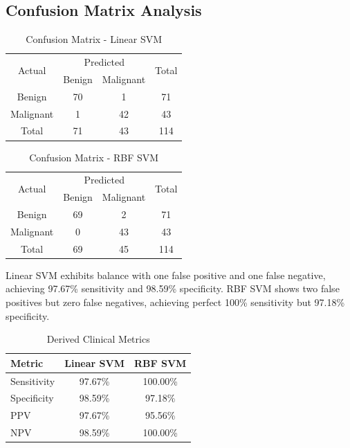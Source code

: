 \documentclass[conference]{IEEEtran}
\begin{document}
\subsection{Confusion Matrix Analysis}

\begin{table}[htbp]
\caption{Confusion Matrix - Linear SVM}
\begin{center}
\footnotesize
\begin{tabular}{cccc}
\toprule
\multirow{2}{*}{Actual} & \multicolumn{2}{c}{Predicted} & \multirow{2}{*}{Total} \\
\cmidrule{2-3}
 & Benign & Malignant & \\
\midrule
Benign & 70 & 1 & 71 \\
Malignant & 1 & 42 & 43 \\
\midrule
Total & 71 & 43 & 114 \\
\bottomrule
\end{tabular}
\label{tab5}
\end{center}
\end{table}

\begin{table}[htbp]
\caption{Confusion Matrix - RBF SVM}
\begin{center}
\footnotesize
\begin{tabular}{cccc}
\toprule
\multirow{2}{*}{Actual} & \multicolumn{2}{c}{Predicted} & \multirow{2}{*}{Total} \\
\cmidrule{2-3}
 & Benign & Malignant & \\
\midrule
Benign & 69 & 2 & 71 \\
Malignant & 0 & 43 & 43 \\
\midrule
Total & 69 & 45 & 114 \\
\bottomrule
\end{tabular}
\label{tab6}
\end{center}
\end{table}

Linear SVM exhibits balance with one false positive and one false negative, achieving 97.67\% sensitivity and 98.59\% specificity. RBF SVM shows two false positives but zero false negatives, achieving perfect 100\% sensitivity but 97.18\% specificity.

\begin{table}[htbp]
\caption{Derived Clinical Metrics}
\begin{center}
\footnotesize
\begin{tabular}{lcc}
\toprule
Metric & Linear SVM & RBF SVM \\
\midrule
Sensitivity & 97.67\% & 100.00\% \\
Specificity & 98.59\% & 97.18\% \\
PPV & 97.67\% & 95.56\% \\
NPV & 98.59\% & 100.00\% \\
\bottomrule
\end{tabular}
\label{tab7}
\end{center}
\end{table}
\end{document}
